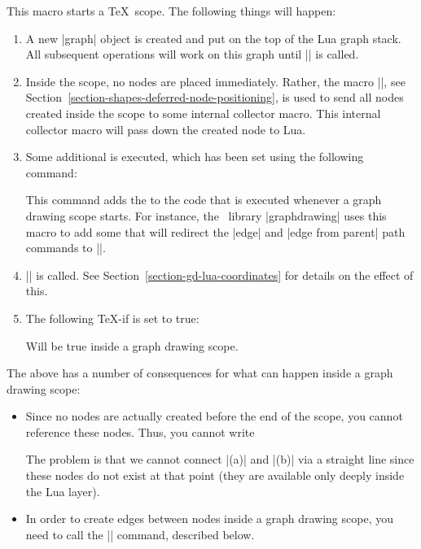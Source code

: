 \begin{command}{\pgfgdbeginscope}
  This macro starts a \TeX\ scope. The following things will happen:
  \begin{enumerate}
  \item A new |graph| object is created and put on the top of the Lua
    graph stack. All subsequent operations will work on this graph until
    |\pgfgdendscope| is called.
  \item Inside the scope, no nodes are placed immediately. Rather, 
    the macro |\pgfpositionnodelater|, see
    Section~\ref{section-shapes-deferred-node-positioning}, is used to
    send all nodes created inside the scope to some internal collector
    macro. This internal collector macro will pass down the created
    node to Lua.
  \item Some additional  is executed, which has been set
    using the following command:
    \begin{command}{\pgfgdaddspecificationhook{}}
      This command adds the  to the code that is executed
      whenever a graph drawing scope starts. For instance, the
      \tikzname\ library |graphdrawing| uses this macro to add some
       that will redirect the |edge| and |edge from parent|
      path commands to |\pgfgdedge|.
    \end{command}
  \item |\pgftransformreset| is called. See
    Section~\ref{section-gd-lua-coordinates} for details on the effect
    of this.
  \item The following \TeX-if is set to true:
    {
      \let\ifpgfgdgraphdrawingscopeactive=\relax
      \begin{textoken}{\ifpgfgdgraphdrawingscopeactive}
        Will be true inside a graph drawing scope.
      \end{textoken}
    }
  \end{enumerate}
  The above has a number of consequences for what can happen inside a
  graph drawing scope:
  \begin{itemize}
  \item Since no nodes are actually created before the end of the
    scope, you cannot reference these nodes. Thus, you cannot write
\begin{codeexample}
\end{codeexample}
    The problem is that we cannot connect |(a)| and |(b)| via a
    straight line since these nodes do not exist at that point (they
    are available only deeply inside the Lua layer).
  \item In order to create edges between nodes inside a graph drawing
    scope, you need to call the |\pgfgdedge| command, described below.
  \end{itemize}
\end{command}


